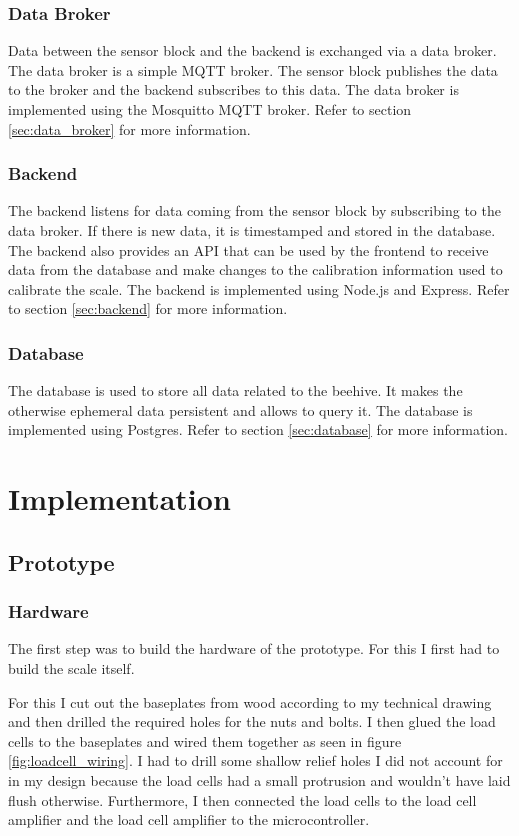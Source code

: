 \subsubsection{Data Broker}
Data between the sensor block and the backend is exchanged via a data broker. The data broker is a simple MQTT broker. The sensor block publishes the data to the broker and the backend subscribes to this data. The data broker is implemented using the \Gls{Mosquitto} \Gls{MQTT} broker. Refer to section \ref{sec:data_broker} for more information.

\subsubsection{Backend}
The backend listens for data coming from the sensor block by subscribing to the data broker. If there is new data, it is timestamped and stored in the database. The backend also provides an API that can be used by the frontend to receive data from the database and make changes to the calibration information used to calibrate the scale. The backend is implemented using Node.js and Express. Refer to section \ref{sec:backend} for more information.

\subsubsection{Database}
The database is used to store all data related to the beehive. It makes the otherwise ephemeral data persistent and allows to query it. The database is implemented using Postgres. Refer to section \ref{sec:database} for more information.

\newpage
\section{Implementation}


\subsection{\Gls{Prototype}}
\subsubsection {Hardware} \label{sec:hardware}
The first step was to build the hardware of the prototype. For this I first had to build the scale itself.

For this I cut out the baseplates from wood according to my technical drawing and then drilled the required holes for the nuts and bolts. I then glued the load cells to the baseplates and wired them together as seen in figure \ref{fig:loadcell_wiring}. I had to drill some shallow relief holes I did not account for in my design because the load cells had a small protrusion and wouldn't have laid flush otherwise. Furthermore, I then connected the load cells to the load cell amplifier and the load cell amplifier to the microcontroller.


